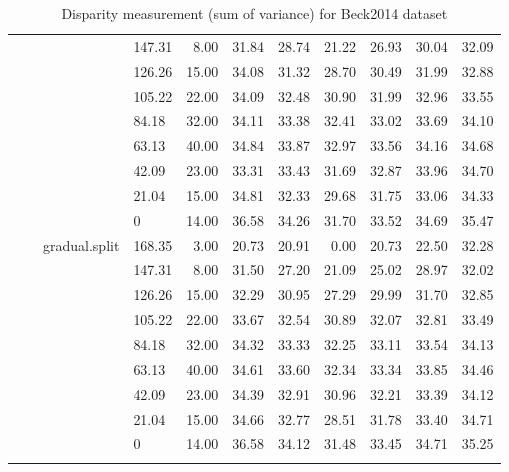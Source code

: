 \begin{longtable}{llllrrrrrrr}
   &  &  & 147.31 & 8.00 & 31.84 & 28.74 & 21.22 & 26.93 & 30.04 & 32.09 \\ 
   &  &  & 126.26 & 15.00 & 34.08 & 31.32 & 28.70 & 30.49 & 31.99 & 32.88 \\ 
   &  &  & 105.22 & 22.00 & 34.09 & 32.48 & 30.90 & 31.99 & 32.96 & 33.55 \\ 
   &  &  & 84.18 & 32.00 & 34.11 & 33.38 & 32.41 & 33.02 & 33.69 & 34.10 \\ 
   &  &  & 63.13 & 40.00 & 34.84 & 33.87 & 32.97 & 33.56 & 34.16 & 34.68 \\ 
   &  &  & 42.09 & 23.00 & 33.31 & 33.43 & 31.69 & 32.87 & 33.96 & 34.70 \\ 
   &  &  & 21.04 & 15.00 & 34.81 & 32.33 & 29.68 & 31.75 & 33.06 & 34.33 \\ 
   &  &  & 0 & 14.00 & 36.58 & 34.26 & 31.70 & 33.52 & 34.69 & 35.47 \\ 
   &  & gradual.split & 168.35 & 3.00 & 20.73 & 20.91 & 0.00 & 20.73 & 22.50 & 32.28 \\ 
   &  &  & 147.31 & 8.00 & 31.50 & 27.20 & 21.09 & 25.02 & 28.97 & 32.02 \\ 
   &  &  & 126.26 & 15.00 & 32.29 & 30.95 & 27.29 & 29.99 & 31.70 & 32.85 \\ 
   &  &  & 105.22 & 22.00 & 33.67 & 32.54 & 30.89 & 32.07 & 32.81 & 33.49 \\ 
   &  &  & 84.18 & 32.00 & 34.32 & 33.33 & 32.25 & 33.11 & 33.54 & 34.13 \\ 
   &  &  & 63.13 & 40.00 & 34.61 & 33.60 & 32.34 & 33.34 & 33.85 & 34.46 \\ 
   &  &  & 42.09 & 23.00 & 34.39 & 32.91 & 30.96 & 32.21 & 33.39 & 34.12 \\ 
   &  &  & 21.04 & 15.00 & 34.66 & 32.77 & 28.51 & 31.78 & 33.40 & 34.71 \\ 
   &  &  & 0 & 14.00 & 36.58 & 34.12 & 31.48 & 33.45 & 34.71 & 35.25 \\ 
   \hline
\hline
\caption{Disparity measurement (sum of variance) for Beck2014 dataset} 
\end{longtable}

